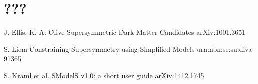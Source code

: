 \chapter{???}
        \loremipsum



        \loremipsum



\begin{thebibliography}{2}
   
             {J. Ellis, K. A. Olive}
             {Supersymmetric Dark Matter Candidates}
             {arXiv:1001.3651}

             {S. Liem}
             {Constraining Supersymmetry using Simplified Models}
             {urn:nbn:se:su:diva-91365}

             {S. Kraml et al.}
             {SModelS v1.0: a short user guide}
             {arXiv:1412.1745}

%
%

\end{thebibliography}

